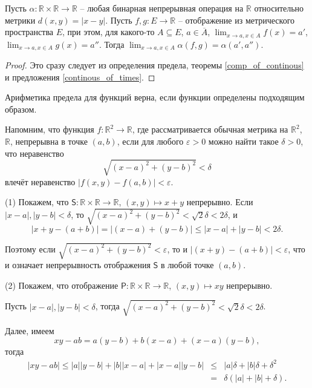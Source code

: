 \begin{theorem}
    Пусть $\alpha: \mathbb{R} \times \mathbb{R} \to \mathbb{R}$ -- любая бинарная непрерывная операция на $\mathbb{R}$ относительно метрики $d(x,y) = |x-y|$. Пусть $f,g:E \to \mathbb{R}$ -- отображение из метрического пространства $E$, при этом, для какого-то $A \subseteq E$, $a\in \overline{A}$, $\lim_{x\to a, x \in A}f(x) = a'$, $\lim_{x\to a, x \in A}g(x) = a''$. Тогда $\lim_{x\to a, x \in A}\alpha(f,g) = \alpha(a',a'').$
\end{theorem}

\begin{proof}
    Это сразу следует из определения предела, теоремы \ref{comp_of_continous} и предложения \ref{continous_of_times}.
\end{proof}


\begin{corollary}
    Арифметика предела для функций верна, если функции определены подходящим образом.
\end{corollary}

Напомним, что функция $f:\mathbb{R}^2 \to \mathbb{R}$, где рассматривается обычная метрика на $\mathbb{R}^2$, $\mathbb{R}$, непрерывна в точке $(a,b)$, если для любого $\varepsilon >0$ можно найти такое $\delta >0$, что неравенство 
\[
 \sqrt{(x-a)^2 + (y-b)^2} < \delta
\]
влечёт неравенство $|f(x,y) - f(a,b)|< \varepsilon$. 

(1) Покажем, что $\mathsf{S}:\mathbb{R} \times \mathbb{R} \to \mathbb{R}$, $(x,y) \mapsto x+y$  непрерывно. Если $|x-a|, |y-b| <\delta$, то $ \sqrt{(x-a)^2 + (y-b)^2} < \sqrt{2}\delta < 2 \delta$, и 
\[
 |x+y - (a+b)| = |(x-a) + (y-b)| \le |x-a| + |y-b| < 2 \delta.
\]

Поэтому если $\sqrt{(x-a)^2 + (y-b)^2}<\varepsilon$, то и $|(x+y) - (a+b)|< \varepsilon$, что и означает непрерывность отображения $\mathsf{S}$ в любой точке $(a,b).$

(2) Покажем, что отображение $\mathsf{P}: \mathbb{R} \times \mathbb{R} \to \mathbb{R}$, $(x,y) \mapsto xy$ непрерывно. 

Пусть $|x-a|, |y-b| < \delta$, тогда  $\sqrt{(x-a)^2 + (y-b)^2} < \sqrt{2}\delta < 2 \delta$.

Далее, имеем
\[
 xy -ab =a (y-b) + b(x-a) + (x-a)(y-b),
\]
тогда
\begin{eqnarray*}
   |xy -ab| \le |a| |y-b| + |b||x-a| + |x-a||y-b|  & \le &   |a| \delta + |b| \delta + \delta^2\\
   &=& \delta (|a| + |b| + \delta).
\end{eqnarray*}

